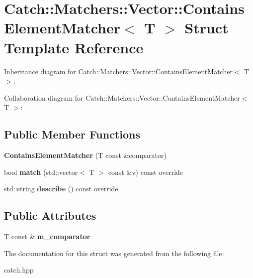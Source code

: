 \hypertarget{structCatch_1_1Matchers_1_1Vector_1_1ContainsElementMatcher}{}\section{Catch\+:\+:Matchers\+:\+:Vector\+:\+:Contains\+Element\+Matcher$<$ T $>$ Struct Template Reference}
\label{structCatch_1_1Matchers_1_1Vector_1_1ContainsElementMatcher}


Inheritance diagram for Catch\+:\+:Matchers\+:\+:Vector\+:\+:Contains\+Element\+Matcher$<$ T $>$\+:


Collaboration diagram for Catch\+:\+:Matchers\+:\+:Vector\+:\+:Contains\+Element\+Matcher$<$ T $>$\+:
\subsection*{Public Member Functions}
\begin{DoxyCompactItemize}
\item 
{\bfseries Contains\+Element\+Matcher} (T const \&comparator)\hypertarget{structCatch_1_1Matchers_1_1Vector_1_1ContainsElementMatcher_a6a05740b5d3f89fac8de84ac0cff7b93}{}\label{structCatch_1_1Matchers_1_1Vector_1_1ContainsElementMatcher_a6a05740b5d3f89fac8de84ac0cff7b93}

\item 
bool {\bfseries match} (std\+::vector$<$ T $>$ const \&v) const override\hypertarget{structCatch_1_1Matchers_1_1Vector_1_1ContainsElementMatcher_a6a4be6e5642e267433d370649beb0fac}{}\label{structCatch_1_1Matchers_1_1Vector_1_1ContainsElementMatcher_a6a4be6e5642e267433d370649beb0fac}

\item 
std\+::string {\bfseries describe} () const override\hypertarget{structCatch_1_1Matchers_1_1Vector_1_1ContainsElementMatcher_aea3b674389a0afd82af6ba4b10f86ae6}{}\label{structCatch_1_1Matchers_1_1Vector_1_1ContainsElementMatcher_aea3b674389a0afd82af6ba4b10f86ae6}

\end{DoxyCompactItemize}
\subsection*{Public Attributes}
\begin{DoxyCompactItemize}
\item 
T const \& {\bfseries m\+\_\+comparator}\hypertarget{structCatch_1_1Matchers_1_1Vector_1_1ContainsElementMatcher_ab7eada6c4bbce1d21b44773262f9cb23}{}\label{structCatch_1_1Matchers_1_1Vector_1_1ContainsElementMatcher_ab7eada6c4bbce1d21b44773262f9cb23}

\end{DoxyCompactItemize}


The documentation for this struct was generated from the following file\+:\begin{DoxyCompactItemize}
\item 
catch.\+hpp\end{DoxyCompactItemize}
